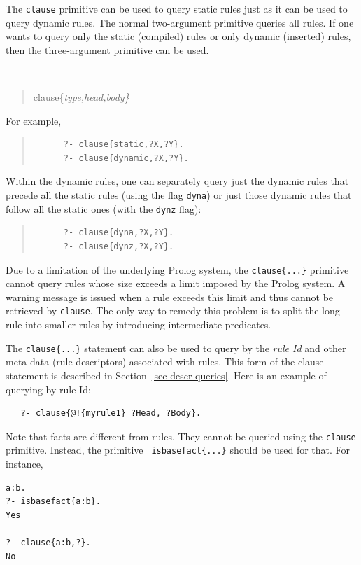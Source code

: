 \documentclass[11pt]{article}
\newcommand{\ERGO}{\mbox{\smaller{\ensuremath{\cal{E}}\smaller{{\sc{RGO}}}}}\xspace}
\newcommand{\FLSYSTEM}{\ERGO}
\begin{document}
The {\tt clause} primitive can be used to query static rules just as it can
be used to query dynamic rules.
The normal two-argument primitive queries all rules. If one wants to query
only the static (compiled) rules or only dynamic (inserted) rules, then the
three-argument primitive can be used.
{\tt
\begin{quote}
clause\{\it{type,head,body}\}
\end{quote}
}
\noindent
For example,
\begin{quote}
\begin{verbatim}
      ?- clause{static,?X,?Y}.
      ?- clause{dynamic,?X,?Y}.
\end{verbatim}
\end{quote}
Within the dynamic rules, one can separately query just the dynamic rules
that precede all the static rules (using the flag {\tt dyna}) or just those
dynamic rules that follow all the static ones (with the {\tt dynz} flag):
\begin{quote}
\begin{verbatim}
      ?- clause{dyna,?X,?Y}.
      ?- clause{dynz,?X,?Y}.
\end{verbatim}
\end{quote}

Due to a limitation of the underlying Prolog system, the {\tt clause\{...\}}
primitive cannot query rules whose size exceeds a limit imposed by the
Prolog system.  A warning message is issued when a rule exceeds this limit
and thus cannot be retrieved by {\tt clause}.  The only way to remedy this
problem is to split the long rule into smaller rules by introducing
intermediate predicates.

The {\tt clause\{...\}} statement can also be used to query by the \emph{rule Id} and
other meta-data (rule descriptors)
associated with \FLSYSTEM rules. This form of the clause
statement is described in Section~\ref{sec-descr-queries}.
Here is an example of querying by rule Id:
\begin{verbatim}
   ?- clause{@!{myrule1} ?Head, ?Body}.
\end{verbatim}

Note that \FLSYSTEM facts are different from rules. They cannot be queried
using the {\tt clause} primitive. Instead, the primitive {\tt
  isbasefact\{...\}} should be used for that. For instance,
\begin{verbatim}
a:b.
?- isbasefact{a:b}.
Yes

?- clause{a:b,?}.
No
\end{verbatim}
\end{document}
